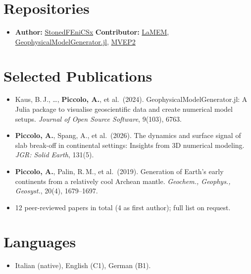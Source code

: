 \documentclass[11pt,a4paper,sans]{moderncv}
\begin{document}

\section{Repositories}
\vspace{1pt}
\begin{itemize}
\item \textbf{Author:} \href{https://github.com/APiccolo89/StonedFenicsx}{StonedFEniCSx} \textbar{} \textbf{Contributor:} \href{https://github.com/UniMainzGeo/LaMEM}{LaMEM}, \href{https://github.com/JuliaGeodynamics/GeophysicalModelGenerator.jl}{GeophysicalModelGenerator.jl}, \href{https://bitbucket.org/bkaus/mvep2/}{MVEP2}
\end{itemize}

\section{Selected Publications}
\vspace{1pt}
{\small
\begin{itemize}
\item Kaus, B.\,J., \ldots, \textbf{Piccolo, A.}, et al.\ (2024). GeophysicalModelGenerator.jl: A Julia package to visualise geoscientific data and create numerical model setups. \textit{Journal of Open Source Software}, 9(103), 6763.
\item \textbf{Piccolo, A.}, Spang, A., et al.\ (2026). The dynamics and surface signal of slab break-off in continental settings: Insights from 3D numerical modeling. \textit{JGR: Solid Earth}, 131(5).
\item \textbf{Piccolo, A.}, Palin, R.\,M., et al.\ (2019). Generation of Earth's early continents from a relatively cool Archean mantle. \textit{Geochem., Geophys., Geosyst.}, 20(4), 1679--1697.
\item[] 12 peer-reviewed papers in total (4 as first author); full list on request.
\end{itemize}}


\section{Languages}
\vspace{1pt}
\begin{itemize}
\item Italian (native), English (C1), German (B1).
\end{itemize}
\end{document}
